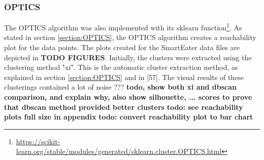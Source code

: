 \subsubsection{OPTICS}
The OPTICS algorithm was also implemented with its sklearn function\footnote{\url{https://scikit-learn.org/stable/modules/generated/sklearn.cluster.OPTICS.html}}. As stated in section \ref{section:OPTICS}, the OPTICS algorithm creates a reachability plot for the data points. The plots created for the SmartEater data files are depicted in \textbf{TODO FIGURES}. Initially, the clusters were extracted using the clustering method "xi". This is the automatic cluster extraction method, as explained in section \ref{section:OPTICS} and in \textcite{OPTICS}[57]. The visual results of these clusterings contained a lot of noise ??? \textbf{todo, show both xi and dbscan comparison, and explain why, also show silhouette, ... scores to prove that dbscan method provided better clusters}
\textbf{todo: see reachability plots full size in appendix}
\textbf{todo: convert reachability plot to bar chart}

